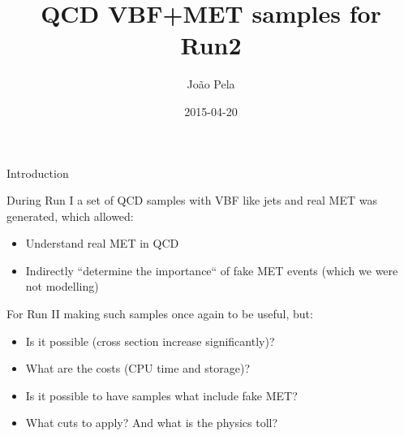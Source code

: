 \documentclass[8pt]{beamer}
\author[J. Pela]{João Pela}
\title{QCD VBF+MET samples for Run2}
\institute[ICL]{Imperial College London}
\date{2015-04-20}
\begin{document}
\setlength{\unitlength}{1mm}

\begin{frame}
  \titlepage
\end{frame}

\begin{frame}{Introduction}

During Run I a set of QCD samples with VBF like jets and real MET was generated, which allowed:

\begin{block}
  
\begin{itemize}
  \item Understand real MET in QCD
  \item Indirectly ``determine the importance`` of fake MET events (which we were not modelling)
\end{itemize}

\end{block}

For Run II making such samples once again to be useful, but:

\begin{block}

\begin{itemize}
  \item Is it possible (cross section increase significantly)?
  \item What are the costs (CPU time and storage)?
  \item Is it possible to have samples what include fake MET?
  \item What cuts to apply? And what is the physics toll?
\end{itemize}
  
\end{block}

\end{frame}
\end{document}
